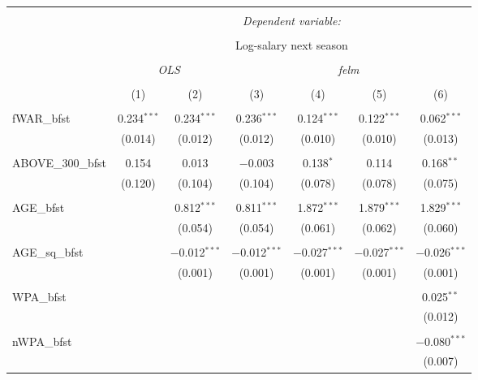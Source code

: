 
\begin{table}[!htbp] \centering
  \caption{}
  \label{}
  \scriptsize
\begin{tabular}{@{\extracolsep{5pt}}lcccccc}
\\[-1.8ex]\hline
\hline \\[-1.8ex]
 & \multicolumn{6}{c}{\textit{Dependent variable:}} \\
\cline{2-7}
\\[-1.8ex] & \multicolumn{6}{c}{Log-salary next season} \\
\\[-1.8ex] & \multicolumn{2}{c}{\textit{OLS}} & \multicolumn{4}{c}{\textit{felm}} \\
\\[-1.8ex] & (1) & (2) & (3) & (4) & (5) & (6)\\
\hline \\[-1.8ex]
 fWAR\_bfst & 0.234$^{***}$ & 0.234$^{***}$ & 0.236$^{***}$ & 0.124$^{***}$ & 0.122$^{***}$ & 0.062$^{***}$ \\
  & (0.014) & (0.012) & (0.012) & (0.010) & (0.010) & (0.013) \\
  & & & & & & \\
 ABOVE\_300\_bfst & 0.154 & 0.013 & $-$0.003 & 0.138$^{*}$ & 0.114 & 0.168$^{**}$ \\
  & (0.120) & (0.104) & (0.104) & (0.078) & (0.078) & (0.075) \\
  & & & & & & \\
 AGE\_bfst &  & 0.812$^{***}$ & 0.811$^{***}$ & 1.872$^{***}$ & 1.879$^{***}$ & 1.829$^{***}$ \\
  &  & (0.054) & (0.054) & (0.061) & (0.062) & (0.060) \\
  & & & & & & \\
 AGE\_sq\_bfst &  & $-$0.012$^{***}$ & $-$0.012$^{***}$ & $-$0.027$^{***}$ & $-$0.027$^{***}$ & $-$0.026$^{***}$ \\
  &  & (0.001) & (0.001) & (0.001) & (0.001) & (0.001) \\
  & & & & & & \\
 WPA\_bfst &  &  &  &  &  & 0.025$^{**}$ \\
  &  &  &  &  &  & (0.012) \\
  & & & & & & \\
 nWPA\_bfst &  &  &  &  &  & $-$0.080$^{***}$ \\
  &  &  &  &  &  & (0.007) \\

\end{tabular}
\end{table}
